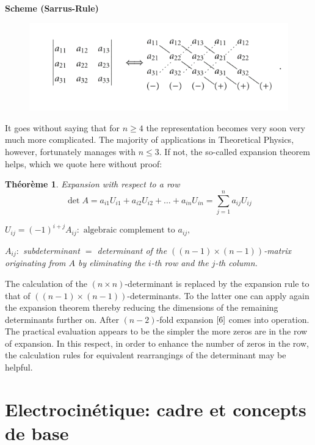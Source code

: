 \documentclass[12pt]{book}
\theoremstyle{definition}\newtheorem{dfn}{Définition}[chapter]
\theoremstyle{plain}\newtheorem{thm}{Théorème}[chapter]
\theoremstyle{plain}\newtheorem{prp}{Proposition}[chapter]
\theoremstyle{plain}\newtheorem{lem}{\bf Lemme}[chapter]
\theoremstyle{plain}\newtheorem{axm}{\bf Axiome}[chapter]
\theoremstyle{plain}\newtheorem{lmm}{\bf Lemme}[chapter]
\theoremstyle{plain}\newtheorem{cor}{\bf Corollaire}[chapter]
\theoremstyle{remark}\newtheorem{rem}{Remarque}[chapter]
\begin{document}
{\bf Scheme (Sarrus-Rule)}
\begin{figure}[H]
	\centering
	\includegraphics[scale=1]{image//Mathematiques preparations//Determinant//2}
\end{figure}
It goes without saying that for $n \geq 4$ the representation becomes very soon very much more complicated. The majority of applications in Theoretical Physics, however, fortunately manages with $n \leq 3 .$ If not, the so-called expansion theorem helps, which we quote here without proof:
\begin{thm} Expansion with respect to a row
\begin{equation}
\operatorname{det} A=a_{i 1} U_{i 1}+a_{i 2} U_{i 2}+\ldots+a_{i n} U_{i n}=\sum_{j=1}^{n} a_{i j} U_{i j}\label{7}
\end{equation}


$U_{i j}=(-1)^{i+j} A_{i j}: \text { algebraic complement to } a_{i j},$


$A_{i j}:$ subdeterminant $=$ determinant of the $((n-1) \times(n-1))$-matrix originating from $A$ by eliminating the $i$-th row and the $j$-th column.
\end{thm}
The calculation of the $(n \times n)$-determinant is replaced by the expansion rule to that of $((n-1) \times(n-1))$-determinants. To the latter one can apply again the expansion theorem thereby reducing the dimensions of the remaining determinants further on. After $(n-2)$-fold expansion $\ref{6}$ comes into operation. The practical evaluation appears to be the simpler the more zeros are in the row of expansion. In this respect, in order to enhance the number of zeros in the row, the calculation rules for equivalent rearrangings of the determinant may be helpful.







	\chapter{Electrocinétique: cadre et concepts de base}
\end{document}
